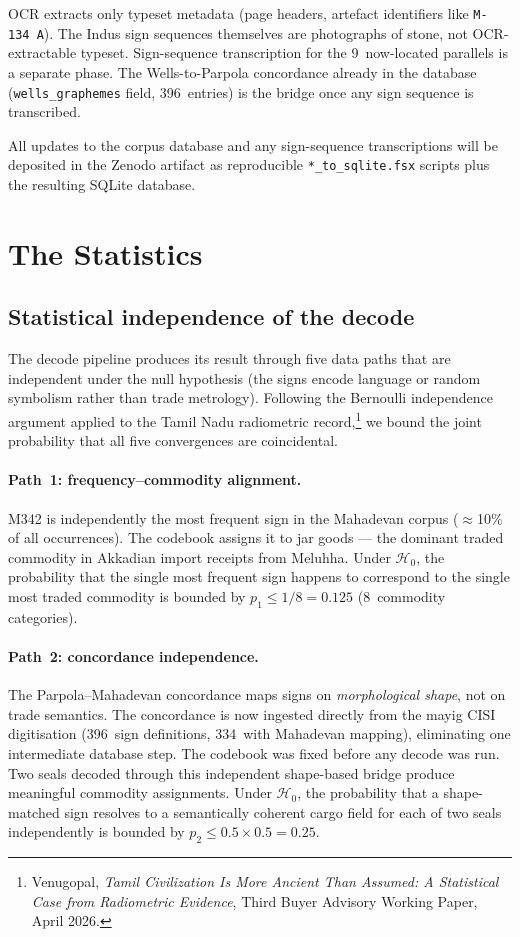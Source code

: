 OCR extracts only typeset metadata (page headers, artefact
identifiers like \texttt{M-134~A}). The Indus sign sequences
themselves are photographs of stone, not OCR-extractable typeset.
Sign-sequence transcription for the 9~now-located parallels is a
separate phase. The Wells-to-Parpola concordance already in the
database (\texttt{wells\_graphemes} field, 396~entries) is the
bridge once any sign sequence is transcribed.

All updates to the corpus database and any sign-sequence
transcriptions will be deposited in the Zenodo artifact as
reproducible \texttt{*\_to\_sqlite.fsx} scripts plus the resulting
SQLite database.

\section{The Statistics}

\subsection{Statistical independence of the decode}

The decode pipeline produces its result through five data paths
that are independent under the null hypothesis (the signs encode
language or random symbolism rather than trade metrology).
Following the Bernoulli independence argument applied to the
Tamil Nadu radiometric record,\footnote{Venugopal,
\textit{Tamil Civilization Is More Ancient Than Assumed:
A Statistical Case from Radiometric Evidence},
Third Buyer Advisory Working Paper, April 2026.}
we bound the joint probability that all five convergences are
coincidental.

\paragraph{Path~1: frequency--commodity alignment.}
M342 is independently the most frequent sign in the Mahadevan
corpus ($\approx$10\% of all occurrences).
The codebook assigns it to jar goods --- the dominant traded
commodity in Akkadian import receipts from Meluhha.
Under $\mathcal{H}_0$, the probability that the single most
frequent sign happens to correspond to the single most traded
commodity is bounded by $p_1 \leq 1/8 = 0.125$ (8~commodity
categories).

\paragraph{Path~2: concordance independence.}
The Parpola--Mahadevan concordance maps signs on
\emph{morphological shape}, not on trade semantics.
The concordance is now ingested directly from the mayig CISI
digitisation (396~sign definitions, 334~with Mahadevan mapping),
eliminating one intermediate database step.
The codebook was fixed before any decode was run.
Two seals decoded through this independent shape-based bridge
produce meaningful commodity assignments.
Under $\mathcal{H}_0$, the probability that a shape-matched
sign resolves to a semantically coherent cargo field for each
of two seals independently is bounded by
$p_2 \leq 0.5 \times 0.5 = 0.25$.

